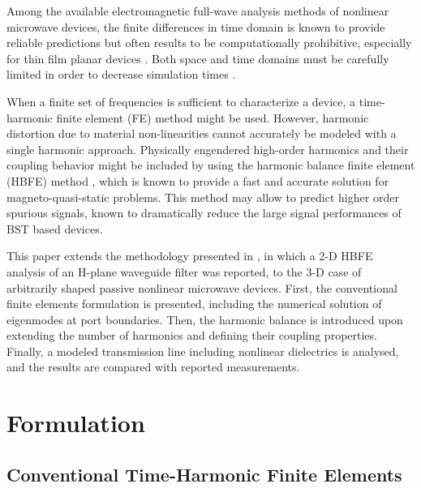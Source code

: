 \documentclass[journal,twoside,letterpaper]{IEEEtran}
\begin{document}
Among the available electromagnetic full-wave analysis methods of nonlinear microwave devices, the finite differences in time domain is known to provide reliable predictions but often results to be computationally prohibitive, especially for thin film planar devices \cite{furlan2015influence}. Both space and time domains must be carefully limited in order to decrease simulation times \cite{caudle2013three}.

When a finite set of frequencies is sufficient to characterize a device, a time-harmonic finite element (FE) method might be used. However, harmonic distortion due to material non-linearities cannot accurately be modeled with a single harmonic approach. Physically engendered high-order harmonics and their coupling behavior might be included by using the harmonic balance finite element (HBFE) method \cite{Yamada1989,Gyselinck2002, Copeland2010}, which is known to provide a fast and accurate solution for magneto-quasi-static problems. This method may allow to predict higher order spurious signals, known to dramatically reduce the large signal performances of BST based devices\cite{price2012temperature}.

This paper extends the methodology presented in \cite{Ntibarikure2012}, in which a \mbox{2-D} HBFE analysis of an H-plane waveguide filter was reported, to the \mbox{3-D} case of arbitrarily shaped passive nonlinear microwave devices. First, the conventional finite elements formulation is presented, including the numerical solution of eigenmodes at port boundaries. Then, the harmonic balance is introduced upon extending the number of harmonics and defining their coupling properties. Finally, a modeled transmission line including nonlinear dielectrics is analysed, and the results are compared with reported measurements.

\section{Formulation}
\subsection{Conventional Time-Harmonic Finite Elements}
\end{document}
